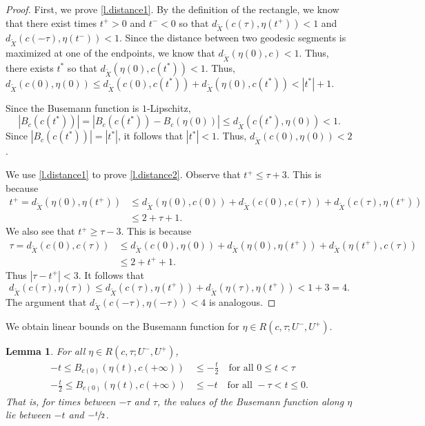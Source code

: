 \documentclass[JEP,XML,SOM,Unicode,NoFloatCountersInSection]{cedram}
\newtheorem{lem}[thm]{Lemma}
\theoremstyle{definition}
\numberwithin{equation}{section}
\begin{document}
\begin{proof}

First, we prove \eqref{l.distance1}. By the definition of the rectangle, we know that there exist times $t^+>0$ and $t^-<0$ so that $d_{\tilde X}(c(\tau), \eta(t^+))<1$ and $d_{\tilde X}(c(-\tau), \eta(t^-))<1$. Since the distance between two geodesic segments is maximized at one of the endpoints, we know that $d_{\tilde X}(\eta(0), c)<1$. Thus, there exists $t^\ast$ so that $d_{\tilde X}(\eta(0), c(t^\ast))<1$. Thus, $d_{\tilde X}(c(0), \eta(0)) \leq d_{\tilde X}(c(0), c(t^\ast))+ d_{\tilde X}(\eta(0), c(t^\ast)) < |t^\ast|+1$.

Since the Busemann function is $1$-Lipschitz,
\[|B_c(c(t^\ast))| = |B_c(c(t^\ast))- B_c(\eta(0))| \leq d_{\tilde X}(c(t^\ast), \eta(0)) <1.\]
Since $|B_c(c(t^\ast))| = |t^\ast|$, it follows that $|t^\ast|<1$. Thus, $d_{\tilde X}(c(0), \eta(0))<2$.

We use \eqref{l.distance1} to prove \eqref{l.distance2}. Observe that $t^+\leq \tau+3$. This is because
\begin{align*}
t^+=d_{\tilde X}(\eta(0), \eta(t^+)) &\leq d_{\tilde X}(\eta(0), c(0))+ d_{\tilde X}(c(0), c(\tau)) + d_{\tilde X}(c(\tau), \eta(t^+)) \\
& \leq 2+\tau +1.
\end{align*}
We also see that $t^+\geq \tau-3$. This is because
\begin{align*}
\tau = d_{\tilde X}(c(0), c(\tau)) & \leq d_{\tilde X}(c(0), \eta(0))+d_{\tilde X}(\eta(0), \eta(t^+))+d_{\tilde X}(\eta(t^+), c(\tau)) \\
& \leq 2 + t^+ +1.
\end{align*}
Thus $|\tau-t^+| <3$. It follows that
\[d_{\tilde X}(c(\tau), \eta(\tau)) \leq d_{\tilde X}(c (\tau), \eta(t^+))+ d_{\tilde X}(\eta(\tau), \eta(t^+))< 1+ 3 = 4.\]
The argument that $d_{\tilde X}(c(-\tau), \eta(-\tau))<4$ is analogous.
\end{proof}

We obtain linear bounds on the Busemann function for $\eta \in R(c, \tau; U^-,U^+)$.

\begin{lem}\label{lem:linear}
For all $\eta \in R(c, \tau; U^-, U^+)$,
\begin{align*}
-t \leq B_{c(0)}(\eta(t),c(+\infty)) &\leq - \frac{t}{2} \quad\mbox{for all } 0\leq t<\tau\\
\tag*{and}
-\frac{t}{2} \leq B_{c(0)}(\eta(t),c(+\infty)) &\leq - t \quad\mbox{for all } -\tau < t \leq 0.
\end{align*}
That is, for times between $-\tau$ and $\tau$, the values of the Busemann function along $\eta$ lie between $-t$ and $-\sfrac{t}{2}$.
\end{lem}
\end{document}
